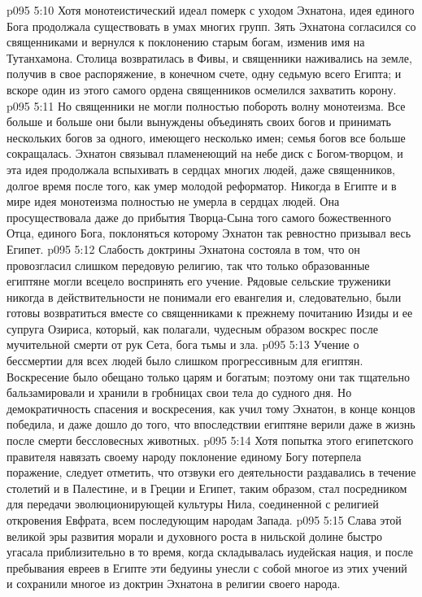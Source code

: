 \vs p095 5:10 \pc Хотя монотеистический идеал померк с уходом Эхнатона, идея единого Бога продолжала существовать в умах многих групп. Зять Эхнатона согласился со священниками и вернулся к поклонению старым богам, изменив имя на Тутанхамона. Столица возвратилась в Фивы, и священники наживались на земле, получив в свое распоряжение, в конечном счете, одну седьмую всего Египта; и вскоре один из этого самого ордена священников осмелился захватить корону.
\vs p095 5:11 Но священники не могли полностью побороть волну монотеизма. Все больше и больше они были вынуждены объединять своих богов и принимать нескольких богов за одного, имеющего несколько имен; семья богов все больше сокращалась. Эхнатон связывал пламенеющий на небе диск с Богом\hyp{}творцом, и эта идея продолжала вспыхивать в сердцах многих людей, даже священников, долгое время после того, как умер молодой реформатор. Никогда в Египте и в мире идея монотеизма полностью не умерла в сердцах людей. Она просуществовала даже до прибытия Творца\hyp{}Сына того самого божественного Отца, единого Бога, поклоняться которому Эхнатон так ревностно призывал весь Египет.
\vs p095 5:12 Слабость доктрины Эхнатона состояла в том, что он провозгласил слишком передовую религию, так что только образованные египтяне могли всецело воспринять его учение. Рядовые сельские труженики никогда в действительности не понимали его евангелия и, следовательно, были готовы возвратиться вместе со священниками к прежнему почитанию Изиды и ее супруга Озириса, который, как полагали, чудесным образом воскрес после мучительной смерти от рук Сета, бога тьмы и зла.
\vs p095 5:13 Учение о бессмертии для всех людей было слишком прогрессивным для египтян. Воскресение было обещано только царям и богатым; поэтому они так тщательно бальзамировали и хранили в гробницах свои тела до судного дня. Но демократичность спасения и воскресения, как учил тому Эхнатон, в конце концов победила, и даже дошло до того, что впоследствии египтяне верили даже в жизнь после смерти бессловесных животных.
\vs p095 5:14 \pc Хотя попытка этого египетского правителя навязать своему народу поклонение единому Богу потерпела поражение, следует отметить, что отзвуки его деятельности раздавались в течение столетий и в Палестине, и в Греции и Египет, таким образом, стал посредником для передачи эволюционирующей культуры Нила, соединенной с религией откровения Евфрата, всем последующим народам Запада.
\vs p095 5:15 Слава этой великой эры развития морали и духовного роста в нильской долине быстро угасала приблизительно в то время, когда складывалась иудейская нация, и после пребывания евреев в Египте эти бедуины унесли с собой многое из этих учений и сохранили многое из доктрин Эхнатона в религии своего народа.

